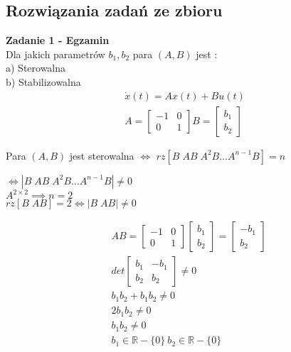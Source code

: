 \documentclass[a4paper,11pt]{article}
\begin{document}
\subsection{Rozwiązania zadań ze zbioru}
\begin{framed}
\textbf{Zadanie 1 - Egzamin } \\ 
Dla jakich parametrów \( b_{1}, b_{2} \) para \( (A,B) \) jest : \\
a) Sterowalna \\
b) Stabilizowalna
\begin{align*}
\dot{x}(t)=Ax(t)+Bu(t) \\
A =
\begin{bmatrix}
-1 & 0 \\
0 & 1 
\end{bmatrix}
B = 
\begin{bmatrix}
b_{1} \\
b_{2}
\end{bmatrix}
\end{align*}
\end{framed}
Para \( (A,B) \) jest sterowalna \( \Longleftrightarrow \) \( rz [ B \; AB \; A^{2}B \dots A^{n-1}B ] = n\) 
\begin{center}
\( \Longleftrightarrow |B \; AB \; A^{2}B \dots A^{n-1}B| \neq 0 \) \\
\( A^{2\times 2} \implies n = 2 \) \\
\( rz[B \; AB ] = 2 \Longleftrightarrow | B \; AB | \neq 0 \)
\end{center}
\begin{align*}
&AB = 
\begin{bmatrix}
-1 & 0 \\
0 & 1
\end{bmatrix}
\begin{bmatrix}
b_{1} \\
b_{2}
\end{bmatrix}
=
\begin{bmatrix}
-b_{1} \\
b_{2}
\end{bmatrix} \\
&det
\begin{bmatrix}
b_{1} & -b_{1} \\
b_{2} & b_{2}
\end{bmatrix}
\neq 0 \\
& b_{1}b_{2}+b_{1}b_{2} \neq 0 \\
&2b_{1}b_{2} \neq 0 \\
&b_{1}b_{2} \neq 0 \\
&b_{1} \in \mathbb{R} - \{0\} \: b_{2} \in \mathbb{R} - \{0\}
\end{align*} 
\end{document}

